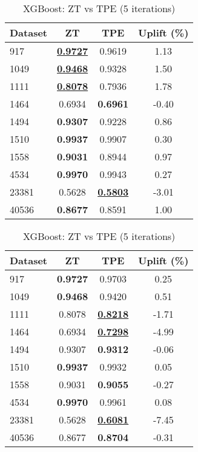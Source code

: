\begin{table}[htbp]
\begin{center}
\begin{small}
\begin{sc}
\begin{subtable}[t]{0.48\textwidth}
    \centering
    \caption{XGBoost: ZT vs TPE (1 iteration)}
    \label{tab:xgboost-zt-vs-tpe-1}
    \begin{tabular}{lccc}
    \toprule
    \textbf{Dataset} & \textbf{ZT} & \textbf{TPE} & \textbf{Uplift (\%)} \\
    \midrule
    917    & \underline{\textbf{0.9727}} & 0.9619 & 1.13 \\
    1049    & \underline{\textbf{0.9468}} & 0.9328 & 1.50 \\
    1111    & \underline{\textbf{0.8078}} & 0.7936 & 1.78 \\
    1464    & 0.6934 & \textbf{0.6961} & -0.40 \\
    1494    & \textbf{0.9307} & 0.9228 & 0.86 \\
    1510    & \textbf{0.9937} & 0.9907 & 0.30 \\
    1558    & \textbf{0.9031} & 0.8944 & 0.97 \\
    4534    & \textbf{0.9970} & 0.9943 & 0.27 \\
    23381    & 0.5628 & \underline{\textbf{0.5803}} & -3.01 \\
    40536    & \textbf{0.8677} & 0.8591 & 1.00 \\
    \bottomrule
    \end{tabular}
\end{subtable}
\hfill
\begin{subtable}[t]{0.48\textwidth}
    \centering
    \caption{XGBoost: ZT vs TPE (5 iterations)}
    \label{tab:xgboost-zt-vs-tpe-5}
    \begin{tabular}{lccc}
    \toprule
    \textbf{Dataset} & \textbf{ZT} & \textbf{TPE} & \textbf{Uplift (\%)} \\
    \midrule
    917    & \textbf{0.9727} & 0.9703 & 0.25 \\
    1049    & \textbf{0.9468} & 0.9420 & 0.51 \\
    1111    & 0.8078 & \underline{\textbf{0.8218}} & -1.71 \\
    1464    & 0.6934 & \underline{\textbf{0.7298}} & -4.99 \\
    1494    & 0.9307 & \textbf{0.9312} & -0.06 \\
    1510    & \textbf{0.9937} & 0.9932 & 0.05 \\
    1558    & 0.9031 & \textbf{0.9055} & -0.27 \\
    4534    & \textbf{0.9970} & 0.9961 & 0.08 \\
    23381    & 0.5628 & \underline{\textbf{0.6081}} & -7.45 \\
    40536    & 0.8677 & \textbf{0.8704} & -0.31 \\
    \bottomrule
    \end{tabular}
\end{subtable}


\end{sc}
\end{small}
\end{center}
\end{table}
